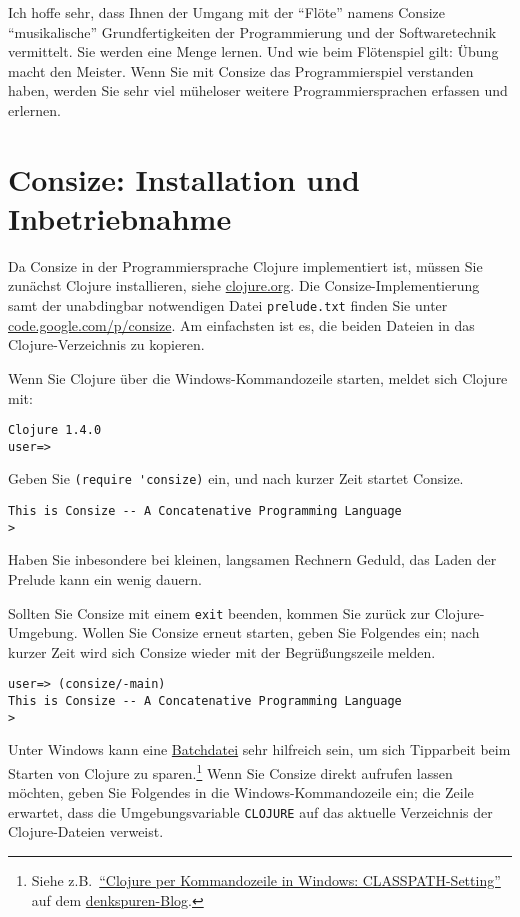 Ich hoffe sehr, dass Ihnen der Umgang mit der "`Flöte"' namens Consize "`musikalische"' Grundfertigkeiten der Programmierung und der Softwaretechnik vermittelt. Sie werden eine Menge lernen. Und wie beim Flötenspiel gilt: Übung macht den Meister. Wenn Sie mit Consize das Programmierspiel verstanden haben, werden Sie sehr viel müheloser weitere Programmiersprachen erfassen und erlernen.

\section{Consize: Installation und Inbetriebnahme}

Da Consize in der Programmiersprache Clojure implementiert ist, müssen Sie zunächst Clojure installieren, siehe \href{http://clojure.org/}{clojure.org}. Die Consize-Im\-ple\-men\-tie\-rung samt der unabdingbar notwendigen Datei \verb|prelude.txt| finden Sie unter \href{http://code.google.com/p/consize}{code.google.com/p/consize}. Am einfachsten ist es, die beiden Dateien in das Clojure-Verzeichnis zu kopieren.

Wenn Sie Clojure über die Windows-Kommandozeile starten, meldet sich Clojure mit:

\begin{verbatim}
Clojure 1.4.0
user=> 
\end{verbatim}

Geben Sie \verb|(require 'consize)| ein, und nach kurzer Zeit startet Consize.

\begin{verbatim}
This is Consize -- A Concatenative Programming Language
> 
\end{verbatim}

Haben Sie inbesondere bei kleinen, langsamen Rechnern Geduld, das Laden der Prelude kann ein wenig dauern.

Sollten Sie Consize mit einem \verb|exit| beenden, kommen Sie zurück zur Clojure-Umgebung. Wollen Sie Consize erneut starten, geben Sie Folgendes ein; nach kurzer Zeit wird sich Consize wieder mit der Begrüßungszeile melden.

\begin{verbatim}
user=> (consize/-main)
This is Consize -- A Concatenative Programming Language
> 
\end{verbatim}

Unter Windows kann eine \href{http://de.wikipedia.org/wiki/Batchdatei}{Batchdatei} sehr hilfreich sein, um sich Tipparbeit beim Starten von Clojure zu sparen.\footnote{Siehe z.B.\ \href{http://denkspuren.blogspot.de/2011/04/clojure-per-kommandozeile-in-windows.html}{"`Clojure per Kommandozeile in Windows: CLASSPATH-Setting"'} auf dem \href{http://denkspuren.blogspot.de}{denkspuren-Blog}.} Wenn Sie Consize direkt aufrufen lassen möchten, geben Sie Folgendes in die Windows-Kommandozeile ein; die Zeile erwartet, dass die Umgebungsvariable \verb|CLOJURE| auf das aktuelle Verzeichnis der Clojure-Dateien verweist. 

